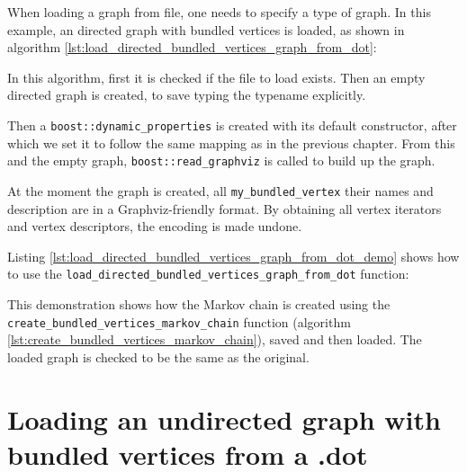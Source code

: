 When loading a graph from file, one needs to specify a type of graph.
In this example, an directed graph with bundled vertices is loaded, as
shown in algorithm \ref{lst:load_directed_bundled_vertices_graph_from_dot}:



In this algorithm, first it is checked if the file to load exists.
Then an empty directed graph is created, to save typing the typename explicitly.

Then a \verb;boost::dynamic_properties; 
is created with its default constructor, after which we set it to follow
the same mapping as in the previous chapter.
From this and the empty graph, \verb;boost::read_graphviz;
is called to build up the graph.

At the moment the graph is created, all \verb;my_bundled_vertex; their names
and description are in a Graphviz-friendly format.
By obtaining all vertex iterators and vertex descriptors, the encoding
is made undone.

Listing \ref{lst:load_directed_bundled_vertices_graph_from_dot_demo}
shows how to use the \verb;load_directed_bundled_vertices_graph_from_dot; function:



This demonstration shows how the Markov chain is created using 
the \verb;create_bundled_vertices_markov_chain; function 
(algorithm \ref{lst:create_bundled_vertices_markov_chain}), 
saved and then loaded.
The loaded graph is checked to be the same as the original.

\section{Loading an undirected graph with bundled vertices from a .dot}
\label{subsec:load_undirected_bundled_vertices_graph_from_dot}

